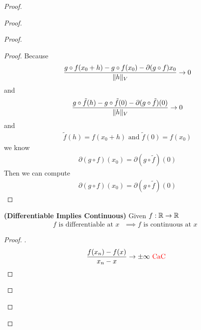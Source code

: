 \documentclass{report}
\begin{document}
\begin{proof}
\begin{proof}
\begin{proof}
\begin{proof}
Because 
\begin{align*}
\frac{g \circ f (x_0+h)-g \circ f(x_0)-\partial (g \circ f)x_0}{\| h \|_V}\to 0
\end{align*}
and 
\begin{align*}
\frac{g \circ  \tilde {f} (h)- g \circ  \tilde{f}(0)-\partial (g\circ  \tilde{f})(0)}{\| h \|_V}\to 0
\end{align*}
and 
\begin{align*}
\tilde{f}(h)=f(x_0+h)\text{ and }\tilde{f}(0)=f(x_0)
\end{align*}
we know 
\begin{align*}
\partial (g \circ  f)(x_0)= \partial (g\circ \tilde{f} )(0)
\end{align*}
Then we can compute 
\begin{align*}
\partial (g \circ f)(x_0)=\partial (g\circ  \tilde{f} )(0)
\end{align*}

\end{proof}
\begin{theorem}
\label{5.1.6}
\textbf{(Differentiable Implies Continuous)} Given $f:\mathbb{R}\rightarrow \mathbb{R}$
\begin{align*}
f\text{ is differentiable at $x$ }\implies f\text{ is continuous at $x$ }
\end{align*}
\end{theorem}
\begin{proof}
.
\begin{align*}
\frac{f(x_n)-f(x)}{x_n-x}\to \pm \infty \text{ \textcolor{red}{CaC} }
\end{align*}
\end{proof}




\end{proof}
\end{proof}
\end{proof}
\end{document}
